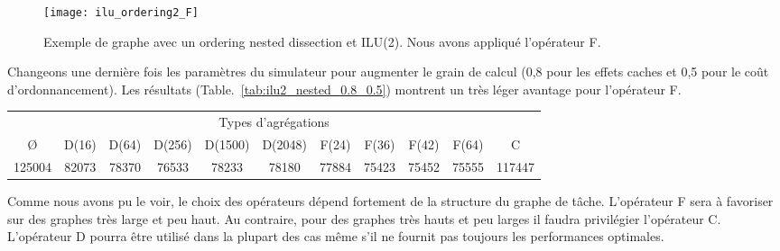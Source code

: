 \begin{figure}[t!]
  \centering
  \texttt{[image: ilu\_ordering2\_F]}
  \caption{Exemple de graphe avec un ordering nested dissection et ILU(2). Nous avons appliqué l'opérateur F.}
  \label{fig:ilu_ordering2_F}
\end{figure}


Changeons une dernière fois les paramètres du simulateur pour augmenter le grain de calcul (0,8 pour les effets caches et 0,5 pour le coût d'ordonnancement).
%
Les résultats (Table.~\ref{tab:ilu2_nested_0.8_0.5}) montrent un très léger avantage pour l'opérateur F.


\begin{center}
  \begin{tabular}{|c|c|c|c|c|c|c|c|c|c|c|}
    \hline
    \multicolumn{11}{|c|}{Types d'agrégations}\\
    \O & D(16) & D(64) & D(256) & D(1500) & D(2048) & F(24) & F(36) & F(42) & F(64) & C \\
    \hline
    125004 & 82073 & 78370 & 76533 & 78233 & 78180 & 77884 & 75423 & 75452 & 75555 & 117447 \\
    \hline
  \end{tabular}
  \label{tab:ilu2_nested_0.8_0.5}
\end{center}


Comme nous avons pu le voir, le choix des opérateurs dépend fortement de la structure du graphe de tâche.
%
L'opérateur F sera à favoriser sur des graphes très large et peu haut.
%
Au contraire, pour des graphes très hauts et peu larges il faudra privilégier l'opérateur C.
%
L'opérateur D pourra être utilisé dans la plupart des cas même s'il ne fournit pas toujours les performances optimales.

